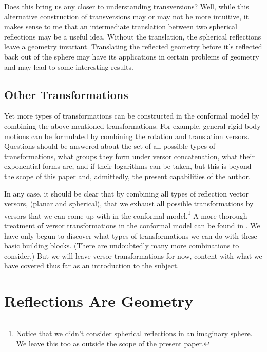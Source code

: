 \documentclass[12pt]{article}
\begin{document}
Does this bring us any closer to understanding transversions?  Well, while this alternative
construction of transversions may or may not be more intuitive, it makes sense to me
that an intermediate translation between two spherical reflections may be a useful idea.
Without the translation, the spherical reflections leave a geometry invariant.  Translating
the reflected geometry before it's reflected back out of the sphere may have its applications
in certain problems of geometry and may lead to some interesting results.

\subsection{Other Transformations}

Yet more types of transformations can be constructed in the conformal model
by combining the above mentioned transformations.  For example, general
rigid body motions can be formulated by combining the rotation and translation
versors.  Questions should be answered about the set of all possible types
of transformations, what groups they form under versor concatenation, what
their exponential forms are, and if their logarithms can be taken, but
this is beyond the scope of this paper and, admittedly, the present capabilities of the author.

In any case, it should be clear that by combining all types of reflection vector versors, (planar and spherical),
that we exhaust all possible transformations by versors that we can come up with in the
conformal model.\footnote{Notice that we didn't consider spherical reflections in an imaginary sphere.
We leave this too as outside the scope of the present paper.}
A more thorough treatment of versor transformations in the conformal model can be found in
\cite{dorst07}.
We have only begun to discover what types of transformations we
can do with these basic building blocks.  (There are undoubtedly many more combinations to
consider.)  But we will leave versor transformations for now, content with what we have
covered thus far as an introduction to the subject.

\section{Reflections Are Geometry}
\end{document}
